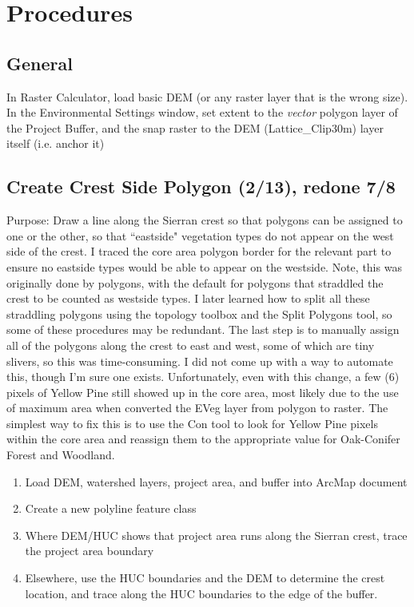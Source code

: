 \chapter{Procedures}

\section{General}
In Raster Calculator, load basic DEM (or any raster layer that is the wrong size). In the Environmental Settings window, set extent to the \emph{vector} polygon layer of the Project Buffer, and the snap raster to the DEM (Lattice\_Clip30m) layer itself (i.e. anchor it)

\section{Create Crest Side Polygon (2/13), redone 7/8}
Purpose: Draw a line along the Sierran crest so that polygons can be assigned to one or the other, so that ``eastside" vegetation types do not appear on the west side of the crest. I traced the core area polygon border for the relevant part to ensure no eastside types would be able to appear on the westside.
Note, this was originally done by polygons, with the default for polygons that straddled the crest to be counted as westside types. I later learned how to split all these straddling polygons using the topology toolbox and the Split Polygons tool, so some of these procedures may be redundant. The last step is to manually assign all of the polygons along the crest to east and west, some of which are tiny slivers, so this was time-consuming. I did not come up with a way to automate this, though I'm sure one exists. Unfortunately, even with this change, a few (6) pixels of Yellow Pine still showed up in the core area, most likely due to the use of maximum area when converted the EVeg layer from polygon to raster. The simplest way to fix this is to use the Con tool to look for Yellow Pine pixels within the core area and reassign them to the appropriate value for Oak-Conifer Forest and Woodland. %

\begin{enumerate}
\item Load DEM, watershed layers, project area, and buffer into ArcMap document
\item Create a new polyline feature class
\item Where DEM/HUC shows that project area runs along the Sierran crest, trace the project area boundary
\item Elsewhere, use the HUC boundaries and the DEM to determine the crest location, and trace along the HUC boundaries to the edge of the buffer.
\end{enumerate}

